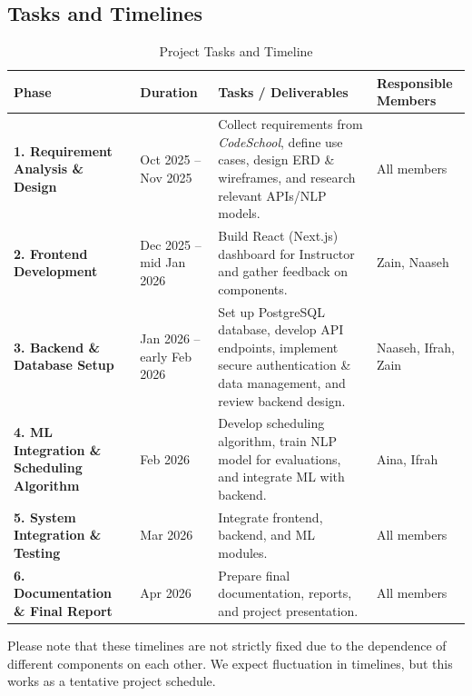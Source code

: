 \subsection{Tasks and Timelines}
\begin{table}[ht!]
\centering
\renewcommand{\arraystretch}{1.2}
\small
\begin{tabular}{|p{3.3cm}|p{2.8cm}|p{7.2cm}|p{2.5cm}|}
\hline
\textbf{Phase} & \textbf{Duration} & \textbf{Tasks / Deliverables} & \textbf{Responsible Members} \\ \hline

\textbf{1. Requirement Analysis \& Design} &
Oct 2025 -- Nov 2025 &
Collect requirements from \textit{CodeSchool}, define use cases, design ERD \& wireframes, and research relevant APIs/NLP models. &
All members \\ \hline

\textbf{2. Frontend Development} &
Dec 2025 -- mid Jan 2026 &
Build React (Next.js) dashboard for Instructor and gather feedback on components. &
Zain, Naaseh \\ \hline

\textbf{3. Backend \& Database Setup} &
Jan 2026 -- early Feb 2026 &
Set up PostgreSQL database, develop API endpoints, implement secure authentication \& data management, and review backend design. &
Naaseh, Ifrah, Zain \\ \hline

\textbf{4. ML Integration \& Scheduling Algorithm} &
Feb 2026 &
Develop scheduling algorithm, train NLP model for evaluations, and integrate ML with backend. &
Aina, Ifrah \\ \hline

\textbf{5. System Integration \& Testing} &
Mar 2026 &
Integrate frontend, backend, and ML modules. &
All members \\ \hline

\textbf{6. Documentation \& Final Report} &
Apr 2026 &
Prepare final documentation, reports, and project presentation. &
All members \\ \hline

\end{tabular}
\caption{Project Tasks and Timeline}
\label{tab:tasks_timeline}
\end{table}
Please note that these timelines are not strictly fixed due to the dependence of different components on each other. We expect fluctuation in timelines, but this works as a tentative project schedule.

